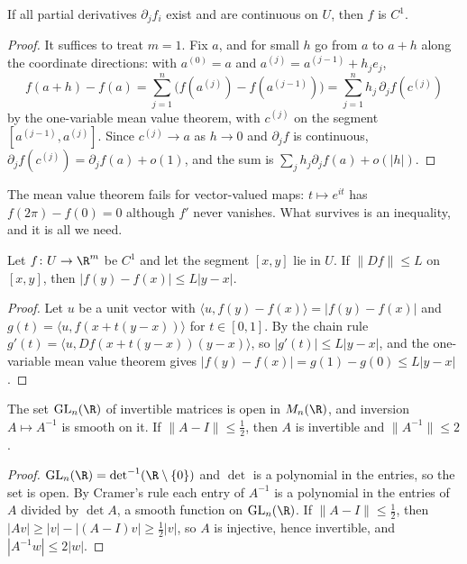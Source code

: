 \begin{proposition}\label{prop:partials}
If all partial derivatives $\partial_jf_i$ exist and are continuous on $U$, then $f$ is $C^1$.
\end{proposition}
\begin{proof}
It suffices to treat $m=1$. Fix $a$, and for small $h$ go from $a$ to $a+h$ along the coordinate directions: with $a^{(0)}=a$ and
$a^{(j)}=a^{(j-1)}+h_je_j$,
\[
f(a+h)-f(a)=\sum_{j=1}^n\bigl(f(a^{(j)})-f(a^{(j-1)})\bigr)=\sum_{j=1}^nh_j\,\partial_jf(c^{(j)})
\]
by the one-variable mean value theorem, with $c^{(j)}$ on the segment $[a^{(j-1)},a^{(j)}]$. Since $c^{(j)}\to a$ as $h\to0$ and $\partial_jf$ is continuous,
$\partial_jf(c^{(j)})=\partial_jf(a)+o(1)$, and the sum is $\sum_jh_j\partial_jf(a)+o(|h|)$.
\end{proof}

The mean value theorem fails for vector-valued maps: $t\mapsto e^{it}$ has $f(2\pi)-f(0)=0$ although $f'$ never vanishes. What survives is an inequality,
and it is all we need.

\begin{lemma}\label{lem:mvi}
Let $f\colon U\to\R^m$ be $C^1$ and let the segment $[x,y]$ lie in $U$. If $\|Df\|\le L$ on $[x,y]$, then $|f(y)-f(x)|\le L|y-x|$.
\end{lemma}
\begin{proof}
Let $u$ be a unit vector with $\langle u,f(y)-f(x)\rangle=|f(y)-f(x)|$ and $g(t)=\langle u,f(x+t(y-x))\rangle$ for $t\in[0,1]$. By the chain rule
$g'(t)=\langle u,Df(x+t(y-x))(y-x)\rangle$, so $|g'(t)|\le L|y-x|$, and the one-variable mean value theorem gives
$|f(y)-f(x)|=g(1)-g(0)\le L|y-x|$.
\end{proof}

\begin{lemma}\label{lem:glnopen}
The set $\mathrm{GL}_n(\R)$ of invertible matrices is open in $M_n(\R)$, and inversion $A\mapsto A^{-1}$ is smooth on it. If $\|A-I\|\le\frac12$, then
$A$ is invertible and $\|A^{-1}\|\le2$.
\end{lemma}
\begin{proof}
$\mathrm{GL}_n(\R)=\det^{-1}(\R\setminus\{0\})$ and $\det$ is a polynomial in the entries, so the set is open. By Cramer's rule each entry of $A^{-1}$ is a
polynomial in the entries of $A$ divided by $\det A$, a smooth function on $\mathrm{GL}_n(\R)$. If $\|A-I\|\le\frac12$, then
$|Av|\ge|v|-|(A-I)v|\ge\frac12|v|$, so $A$ is injective, hence invertible, and $|A^{-1}w|\le2|w|$.
\end{proof}

